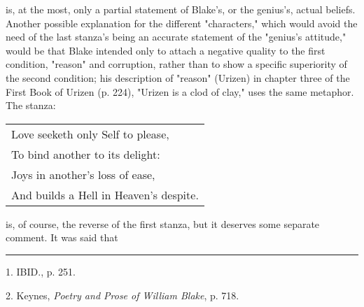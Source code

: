 is, at the most, only a partial statement of Blake's, or the genius's, actual beliefs. Another possible explanation for the
different "characters," which would avoid the need of the last stanza's being an accurate statement of the "genius's attitude," would be
that Blake intended only to attach a negative quality to the first condition, "reason" and corruption, rather than to show a specific
superiority of the second condition; his description of "reason" (Urizen) in chapter three of the First Book of Urizen (p. 224), "Urizen is a
clod of clay," uses the same metaphor. The stanza:\par
\begin{center}
	\begin{tabular}{l}
		Love seeketh only Self to please, \\
		To bind another to its delight:   \\
		Joys in another's loss of ease,   \\
		And builds a Hell in Heaven's despite.\par
	\end{tabular}
\end{center}
is, of course, the reverse of the first stanza, but it deserves some separate comment. It was said that\linebreak
\null\par
\vspace*{-\baselineskip}
\vspace*{\fill}
\noindent\rule{0.25\textwidth}{0.4pt}\par
1. IBID., p. 251.\par
2. Keynes, \textit{Poetry and Prose of William Blake}, p. 718.\par

\newpage

